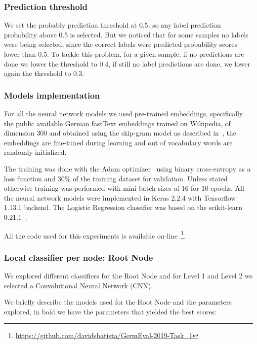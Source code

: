 \documentclass[11pt,a4paper]{article}
\begin{document}
\subsubsection{Prediction threshold}\label{threshold}

We set the probably prediction threshold at 0.5, so any label prediction probability
above 0.5 is selected. But we noticed that for some samples no labels were
being selected, since the correct labels were predicted probability scores lower than 0.5.
To tackle this problem, for a given sample, if no predictions are done we lower
the threshold to 0.4, if still no label predictions are done, we lower again
the threshold to 0.3.


\subsubsection{Models implementation}

For all the neural network models we used pre-trained embeddings, specifically
the public available German fastText embeddings trained on Wikipedia, of
dimension 300 and obtained using the skip-gram model as described
in~\citet{bojanowski-etal-2017-enriching}, the embeddings are fine-tuned
during learning and out of vocabulary words are randomly initialized.

The training was done with the Adam optimizer~\cite{journals/corr/KingmaB14}
using binary cross-entropy as a loss function and 30\% of the training
dataset for validation. Unless stated otherwise training was performed with
mini-batch sizes of 16 for 10 epochs. All the neural network models were implemented in
Keras 2.2.4 with Tensorflow 1.13.1 backend. The Logistic Regression classifier
was based on the scikit-learn 0.21.1~\cite{Pedregosa:2011:SML:1953048.2078195}.

All the code used for this experiments is available
on-line~\footnote{\url{https://github.com/davidsbatista/GermEval-2019-Task_1}}.


\subsubsection{Local classifier per node: Root Node}

We explored different classifiers for the Root Node and for Level 1 and Level 2 we
selected a Convolutional Neural Network (CNN).

We briefly describe the models used for the Root Node and the parameters explored,
in bold we have the parameters that yielded the best scores:
\end{document}
